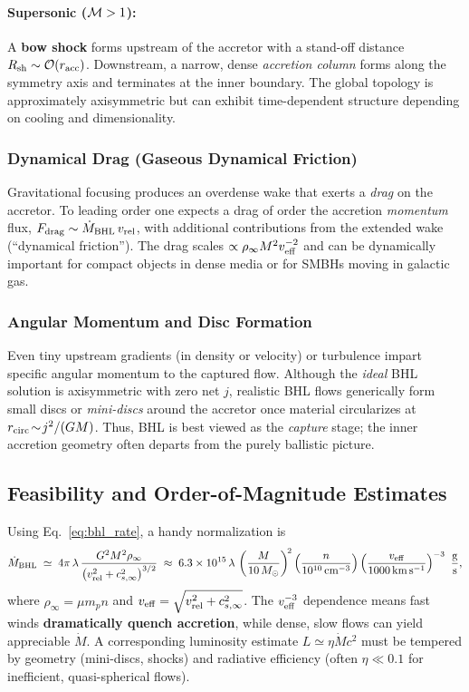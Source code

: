 \paragraph{Supersonic (${\cal M}>1$):}
A \textbf{bow shock} forms upstream of the accretor with a stand-off distance
$R_{\rm sh}\sim {\cal O}(r_{\rm acc})$. Downstream, a narrow, dense \emph{accretion column} forms along the symmetry axis and terminates at the inner boundary. The global topology is approximately axisymmetric but can exhibit
time-dependent structure depending on cooling and dimensionality.

\subsubsection{Dynamical Drag (Gaseous Dynamical Friction)}

Gravitational focusing produces an overdense wake that exerts a \emph{drag} on the
accretor. To leading order one expects a drag of order the accretion \emph{momentum}
flux, $F_{\rm drag}\sim \dot M_{\rm BHL}\,v_{\rm rel}$, with additional
contributions from the extended wake (``dynamical friction''). The drag scales
$\propto \rho_\infty M^2 v_{\rm eff}^{-2}$ and can be dynamically important for
compact objects in dense media or for SMBHs moving in galactic gas.

\subsubsection{Angular Momentum and Disc Formation}

Even tiny upstream gradients (in density or velocity) or turbulence impart specific
angular momentum to the captured flow. Although the \emph{ideal} BHL solution is
axisymmetric with zero net $j$, realistic BHL flows generically form small discs or
\emph{mini-discs} around the accretor once material circularizes at $r_{\rm circ}\!\sim\! j^2/(GM)$. Thus, BHL is best viewed as the \emph{capture} stage; the inner accretion geometry often departs from the purely ballistic picture.

\subsection{Feasibility and Order-of-Magnitude Estimates}

Using Eq.~\eqref{eq:bhl_rate}, a handy normalization is
\begin{equation}
\dot M_{\rm BHL} \;\simeq\;
4\pi\,\lambda\,\frac{G^2 M^2 \rho_\infty}{\big(v_{\rm rel}^2 + c_{s,\infty}^2\big)^{3/2}}
\;\approx\;
6.3\times 10^{15}\,\lambda\,
\left(\frac{M}{10\,M_\odot}\right)^{\!2}
\left(\frac{n}{10^{10}\,{\rm cm^{-3}}}\right)
\left(\frac{v_{\rm eff}}{1000\,{\rm km\,s^{-1}}}\right)^{-3}
\ \frac{{\rm g}}{\rm s},
\end{equation}
where $\rho_\infty=\mu m_p n$ and $v_{\rm eff}=\sqrt{v_{\rm rel}^2+c_{s,\infty}^2}$.
The $v_{\rm eff}^{-3}$ dependence means fast winds \textbf{dramatically quench accretion}, while dense, slow flows can yield appreciable $\dot M$. A corresponding luminosity estimate $L\simeq \eta \dot M c^2$ must be tempered by geometry (mini-discs, shocks) and radiative efficiency (often $\eta\ll 0.1$ for inefficient, quasi-spherical flows).

